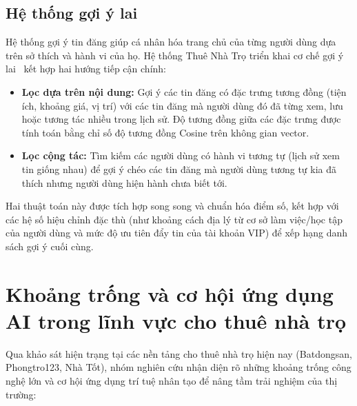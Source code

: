 \FloatBarrier
\subsection{Hệ thống gợi ý lai}

Hệ thống gợi ý tin đăng giúp cá nhân hóa trang chủ của từng người dùng dựa trên sở thích và hành vi của họ. Hệ thống Thuê Nhà Trọ triển khai cơ chế gợi ý lai~\cite{Burke2002} kết hợp hai hướng tiếp cận chính:
\begin{itemize}
    \item \textbf{Lọc dựa trên nội dung:} Gợi ý các tin đăng có đặc trưng tương đồng (tiện ích, khoảng giá, vị trí) với các tin đăng mà người dùng đó đã từng xem, lưu hoặc tương tác nhiều trong lịch sử. Độ tương đồng giữa các đặc trưng được tính toán bằng chỉ số độ tương đồng Cosine trên không gian vector.
    \item \textbf{Lọc cộng tác:} Tìm kiếm các người dùng có hành vi tương tự (lịch sử xem tin giống nhau) để gợi ý chéo các tin đăng mà người dùng tương tự kia đã thích nhưng người dùng hiện hành chưa biết tới.
\end{itemize}
Hai thuật toán này được tích hợp song song và chuẩn hóa điểm số, kết hợp với các hệ số hiệu chỉnh đặc thù (như khoảng cách địa lý từ cơ sở làm việc/học tập của người dùng và mức độ ưu tiên đẩy tin của tài khoản VIP) để xếp hạng danh sách gợi ý cuối cùng.

\section{Khoảng trống và cơ hội ứng dụng AI trong lĩnh vực cho thuê nhà trọ}

Qua khảo sát hiện trạng tại các nền tảng cho thuê nhà trọ hiện nay (Batdongsan, Phongtro123, Nhà Tốt), nhóm nghiên cứu nhận diện rõ những khoảng trống công nghệ lớn và cơ hội ứng dụng trí tuệ nhân tạo để nâng tầm trải nghiệm của thị trường:

